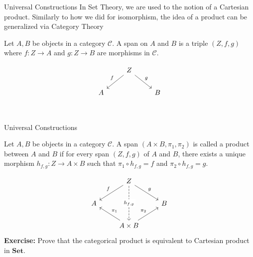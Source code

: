 \documentclass[aspectratio=169,xcolor=dvipsnames,10pt]{beamer}
\theoremstyle{definition}
\begin{document}
\begin{frame}[fragile]{Universal Constructions}
    In Set Theory, we are used to the notion of a Cartesian product.
    Similarly to how we did for isomorphism, the idea of a product can be generalized via Category Theory
	\begin{definition}[Span]
        Let $A,B$ be objects in a  category $\mathcal C$. A span
        on $A$ and $B$ is a triple $(Z,f,g)$ where $f:Z\to A$ and
        $g:Z\to B$ are morphisms in $\mathcal C$.
	\end{definition}
    \[\begin{tikzcd}
        & Z \\
        A && B \\
        \arrow["f"', from=1-2, to=2-1]
        \arrow["g", from=1-2, to=2-3]
    \end{tikzcd}\]
\end{frame}

\begin{frame}[fragile]{Universal Constructions}
    \begin{definition}
        Let $A,B$ be objects in a  category $\mathcal C$. A span $(A\times B, \pi_1, \pi_2)$
        is called a product between $A$ and $B$ if for every span $(Z, f, g)$ of $A$ and $B$,
        there exists a unique morphism $h_{f,g}:Z \to A \times B$ such that
        $\pi_1 \circ h_{f,g} = f$ and $\pi_2 \circ h_{f,g} = g$.
    \end{definition}
    \[\begin{tikzcd}
        & Z \\
        A && B \\
        & {A \times B}
        \arrow["f"', from=1-2, to=2-1]
        \arrow["g", from=1-2, to=2-3]
        \arrow["{h_{f,g}}"{description}, dashed, from=1-2, to=3-2]
        \arrow["{\pi_1}"', from=3-2, to=2-1]
        \arrow["{\pi_2}", from=3-2, to=2-3]
    \end{tikzcd}\]
    \textbf{Exercise:} Prove that the categorical product is equivalent to Cartesian product in $\mathbf{Set}$.
\end{frame}
\end{document}
